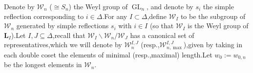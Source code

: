 \documentclass[10pt]{article}
\DeclareMathOperator{\GL}{GL}
\newcommand{\ul}{\underline}
\newcommand{\bL}{{\mathbf{L}}}
\newcommand{\fg}{{\mathfrak{g}}}
\newcommand{\fp}{{\mathfrak{p}}}
\newcommand{\sW}{\mathscr W}
\begin{document}



Denote by $\sW_n$ ($\cong S_n$) the Weyl group of $\GL_n$, and denote by $s_{i}$ the simple reflection corresponding to $i\in \Delta$.\;For any $I\subset \Delta$,\;define $\sW_{I}$ to be the subgroup of $\sW_{n}$ generated by simple reflections $s_{i}$ with $i\in I$ (so that $\sW_I$ is the Weyl group of $\bL_I$).\;Let $I,J\subseteq\Delta$,\;recall that $\sW_{I}\backslash \sW_n/\sW_{J}$ has a canonical set of representatives,\;which we will denote by $\sW^{I,J}_n$ (resp.,\;$\sW^{I,J}_{n,\max}$),\;given by taking in each double coset the elements of minimal (resp.,\;maximal) length.\;Let $w_0:=w_{0,n}$  be the longest elements in $\sW_{n}$.\;


\end{document}

